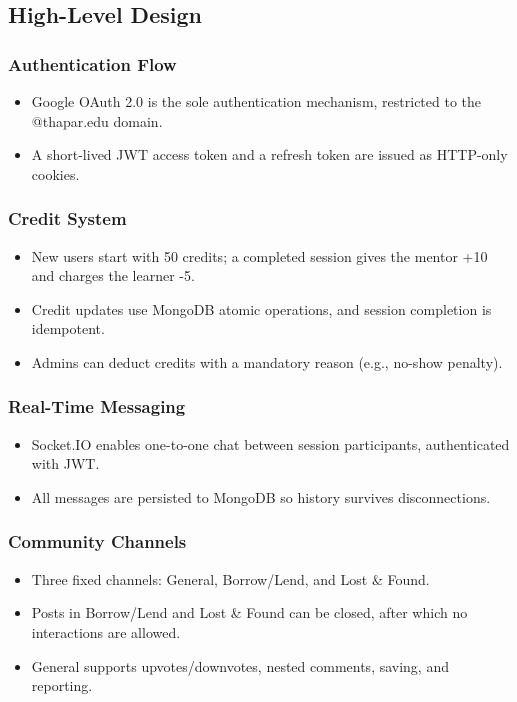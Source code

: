 \documentclass{tietreport}
\begin{document}
\subsection{High-Level Design}

\subsubsection{Authentication Flow}

\begin{itemize}
  \item Google OAuth 2.0 is the sole authentication mechanism, restricted to the @thapar.edu domain.
  \item A short-lived JWT access token and a refresh token are issued as HTTP-only cookies.
\end{itemize}

\subsubsection{Credit System}

\begin{itemize}
  \item New users start with 50 credits; a completed session gives the mentor +10 and charges the learner -5.
  \item Credit updates use MongoDB atomic operations, and session completion is idempotent.
  \item Admins can deduct credits with a mandatory reason (e.g., no-show penalty).
\end{itemize}

\subsubsection{Real-Time Messaging}

\begin{itemize}
  \item Socket.IO enables one-to-one chat between session participants, authenticated with JWT.
  \item All messages are persisted to MongoDB so history survives disconnections.
\end{itemize}

\subsubsection{Community Channels}

\begin{itemize}
  \item Three fixed channels: General, Borrow/Lend, and Lost \& Found.
  \item Posts in Borrow/Lend and Lost \& Found can be closed, after which no interactions are allowed.
  \item General supports upvotes/downvotes, nested comments, saving, and reporting.
\end{itemize}
\end{document}
